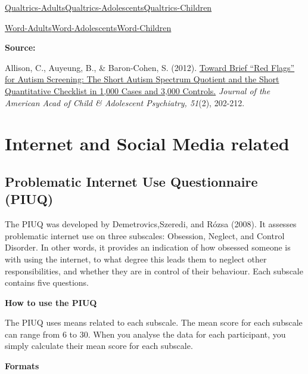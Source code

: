 \documentclass[
]{book}
\begin{document}
\href{questionnaires/AutismSpectrumQuotient_Adults.qsf}{Qualtrics-Adults}\textbar{}\href{questionnaires/AutismSpectrumQuotient_Adolescent.qsf}{Qualtrics-Adolescents}\textbar{}\href{questionnaires/AutismSpectrumQuotient_Children.qsf}{Qualtrics-Children}

\href{questionnaires/AutismSpectrumQuotient_Adults.docx}{Word-Adults}\textbar{}\href{questionnaires/AutismSpectrumQuotient_Adolescent.docx}{Word-Adolescents}\textbar{}\href{questionnaires/AutismSpectrumQuotient_Children.docx}{Word-Children}

\textbf{Source:}

Allison, C., Auyeung, B., \& Baron-Cohen, S. (2012). \href{http://citeseerx.ist.psu.edu/viewdoc/download?doi=10.1.1.232.4537\&rep=rep1\&type=pdf}{Toward Brief ``Red Flags'' for Autism Screening: The Short Autism Spectrum Quotient and the Short Quantitative Checklist in 1,000 Cases and 3,000 Controls.} \emph{Journal of the American Acad of Child \& Adolescent Psychiatry, 51}(2), 202-212.

\hypertarget{internet-and-social-media-related}{%
\section{Internet and Social Media related}\label{internet-and-social-media-related}}

\hypertarget{problematic-internet-use-questionnaire-piuq}{%
\subsection{Problematic Internet Use Questionnaire (PIUQ)}\label{problematic-internet-use-questionnaire-piuq}}

The PIUQ was developed by Demetrovics,Szeredi, and Rózsa (2008). It assesses problematic internet use on three subscales: Obsession, Neglect, and Control Disorder. In other words, it provides an indication of how obsessed someone is with using the internet, to what degree this leads them to neglect other responsibilities, and whether they are in control of their behaviour. Each subscale contains five questions.

\textbf{How to use the PIUQ}

The PIUQ uses means related to each subscale. The mean score for each subscale can range from 6 to 30. When you analyse the data for each participant, you simply calculate their mean score for each subscale.

\textbf{Formats}
\end{document}
